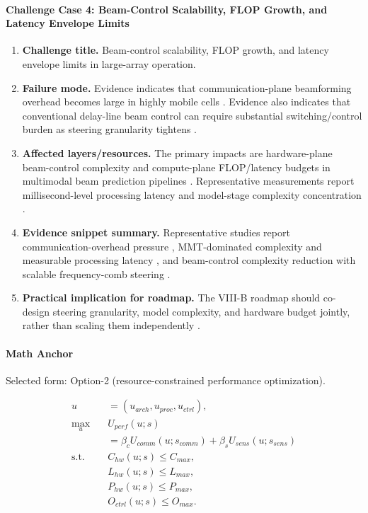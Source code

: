 \documentclass[lettersize,journal]{IEEEtran}
\begin{document}
\paragraph{Challenge Case 4: Beam-Control Scalability, FLOP Growth, and Latency Envelope Limits}
\begin{enumerate}
    \item \textbf{Challenge title.} Beam-control scalability, FLOP growth, and latency envelope limits in large-array operation.
    \item \textbf{Failure mode.} Evidence indicates that communication-plane beamforming overhead becomes large in highly mobile cells \cite{O_ISAC_134}. Evidence also indicates that conventional delay-line beam control can require substantial switching/control burden as steering granularity tightens \cite{O_ISAC_171}.
    \item \textbf{Affected layers/resources.} The primary impacts are hardware-plane beam-control complexity and compute-plane FLOP/latency budgets in multimodal beam prediction pipelines \cite{O_ISAC_134, O_ISAC_171}. Representative measurements report millisecond-level processing latency and model-stage complexity concentration \cite{O_ISAC_134}.
    \item \textbf{Evidence snippet summary.} Representative studies report communication-overhead pressure \cite{O_ISAC_134}, MMT-dominated complexity and measurable processing latency \cite{O_ISAC_134}, and beam-control complexity reduction with scalable frequency-comb steering \cite{O_ISAC_171}.
    \item \textbf{Practical implication for roadmap.} The VIII-B roadmap should co-design steering granularity, model complexity, and hardware budget jointly, rather than scaling them independently \cite{O_ISAC_134, O_ISAC_171}.
\end{enumerate}

\paragraph{Math Anchor}
Selected form: Option-2 (resource-constrained performance optimization).

\begin{equation}
\begin{aligned}
u &= (u_{arch},u_{proc},u_{ctrl}),\\
\max_{u} \quad & U_{perf}(u;s) \\
&= \beta_c U_{comm}(u;s_{comm})+\beta_s U_{sens}(u;s_{sens}) \\
\text{s.t.} \quad & C_{hw}(u;s) \le C_{max}, \\
& L_{hw}(u;s) \le L_{max}, \\
& P_{hw}(u;s) \le P_{max}, \\
& O_{ctrl}(u;s) \le O_{max}.
\end{aligned}
\end{equation}
\end{document}
